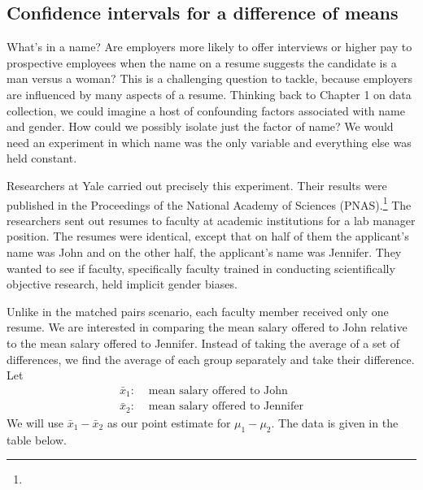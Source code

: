 \D{\newpage}

\subsection{Confidence intervals for a difference of means}




\newcommand{\johnn}{63}
\newcommand{\jennifern}{64}
\newcommand{\johnmean}{30,238}
\newcommand{\jennifermean}{26,508}
\newcommand{\johnsd}{5567}
\newcommand{\jennifersd}{7247}
\newcommand{\johnjenniferSE}{1151}

What's in a name?  Are employers more likely to offer interviews or higher pay to prospective employees when the name on a resume suggests the candidate is a man versus a woman?  This is a challenging question to tackle, because employers are influenced by many aspects of a resume.  Thinking back to Chapter 1 on data collection, we could imagine a host of confounding factors associated with name and gender.  How could we possibly isolate just the factor of name?  We would need an experiment in which name was the only variable and everything else was held constant.

Researchers at Yale carried out precisely this experiment.  Their results were published in the Proceedings of the National Academy of Sciences (PNAS).\footnote{} The researchers sent out resumes to faculty at academic institutions for a lab manager position.  The resumes were identical, except that on half of them the applicant's name was John and on the other half, the applicant's name was Jennifer.  They wanted to see if faculty, specifically faculty trained in conducting scientifically objective research, held implicit gender biases.

Unlike in the matched pairs scenario, each faculty member received only one resume.  We are interested in comparing the mean salary offered to John relative to the mean salary offered to Jennifer.  Instead of taking the average of a set of differences, we find the average of each group separately and take their difference.  Let
\begin{align*}
\bar{x}_1:& \text{ mean salary offered to John}\\
\bar{x}_2: &\text{ mean salary offered to Jennifer}
\end{align*}
We will use $\bar{x}_1 - \bar{x}_2$ as our point estimate for $\mu_1-\mu_2$.  The data is given in the table below.

